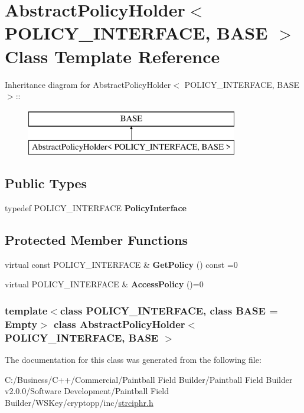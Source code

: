 \hypertarget{class_abstract_policy_holder}{
\section{AbstractPolicyHolder$<$ POLICY\_\-INTERFACE, BASE $>$ Class Template Reference}
\label{class_abstract_policy_holder}
}
Inheritance diagram for AbstractPolicyHolder$<$ POLICY\_\-INTERFACE, BASE $>$::\begin{figure}[H]
\begin{center}
\leavevmode
\includegraphics[height=2cm]{class_abstract_policy_holder}
\end{center}
\end{figure}
\subsection*{Public Types}
\begin{DoxyCompactItemize}
\item 
\hypertarget{class_abstract_policy_holder_afebbd551c30ef32e3bbcbdf5bfecd303}{
typedef POLICY\_\-INTERFACE {\bfseries PolicyInterface}}
\label{class_abstract_policy_holder_afebbd551c30ef32e3bbcbdf5bfecd303}

\end{DoxyCompactItemize}
\subsection*{Protected Member Functions}
\begin{DoxyCompactItemize}
\item 
\hypertarget{class_abstract_policy_holder_a79ca3b9d0978014af386bba02cd7ae95}{
virtual const POLICY\_\-INTERFACE \& {\bfseries GetPolicy} () const =0}
\label{class_abstract_policy_holder_a79ca3b9d0978014af386bba02cd7ae95}

\item 
\hypertarget{class_abstract_policy_holder_a7a36ff9d4d887f3002b069fa4bb4c28c}{
virtual POLICY\_\-INTERFACE \& {\bfseries AccessPolicy} ()=0}
\label{class_abstract_policy_holder_a7a36ff9d4d887f3002b069fa4bb4c28c}

\end{DoxyCompactItemize}
\subsubsection*{template$<$class POLICY\_\-INTERFACE, class BASE = Empty$>$ class AbstractPolicyHolder$<$ POLICY\_\-INTERFACE, BASE $>$}



The documentation for this class was generated from the following file:\begin{DoxyCompactItemize}
\item 
C:/Business/C++/Commercial/Paintball Field Builder/Paintball Field Builder v2.0.0/Software Development/Paintball Field Builder/WSKey/cryptopp/inc/\hyperlink{strciphr_8h}{strciphr.h}\end{DoxyCompactItemize}
